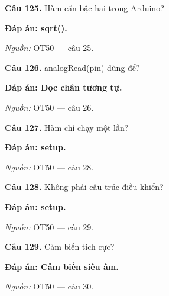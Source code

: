 \documentclass[11pt,a4paper]{article}
\begin{document}
\textbf{Câu 125.} Hàm căn bậc hai trong Arduino?\par
{\color{answer}\textbf{Đáp án: sqrt().}}\par
{\footnotesize\color{sourcegray}\textit{Nguồn:} OT50 — câu 25.\par}
\vspace{3pt}\par\noindent{\color{black!18}\rule{\linewidth}{0.3pt}}\par\medskip

\textbf{Câu 126.} analogRead(pin) dùng để?\par
{\color{answer}\textbf{Đáp án: Đọc chân tương tự.}}\par
{\footnotesize\color{sourcegray}\textit{Nguồn:} OT50 — câu 26.\par}
\vspace{3pt}\par\noindent{\color{black!18}\rule{\linewidth}{0.3pt}}\par\medskip

\textbf{Câu 127.} Hàm chỉ chạy một lần?\par
{\color{answer}\textbf{Đáp án: setup.}}\par
{\footnotesize\color{sourcegray}\textit{Nguồn:} OT50 — câu 28.\par}
\vspace{3pt}\par\noindent{\color{black!18}\rule{\linewidth}{0.3pt}}\par\medskip

\textbf{Câu 128.} Không phải cấu trúc điều khiển?\par
{\color{answer}\textbf{Đáp án: setup.}}\par
{\footnotesize\color{sourcegray}\textit{Nguồn:} OT50 — câu 29.\par}
\vspace{3pt}\par\noindent{\color{black!18}\rule{\linewidth}{0.3pt}}\par\medskip

\textbf{Câu 129.} Cảm biến tích cực?\par
{\color{answer}\textbf{Đáp án: Cảm biến siêu âm.}}\par
{\footnotesize\color{sourcegray}\textit{Nguồn:} OT50 — câu 30.\par}
\vspace{3pt}\par\noindent{\color{black!18}\rule{\linewidth}{0.3pt}}\par\medskip
\end{document}
